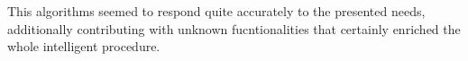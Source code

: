 This algorithms seemed to respond quite accurately to the presented needs, additionally contributing with unknown fucntionalities that certainly enriched the whole intelligent procedure.



	


